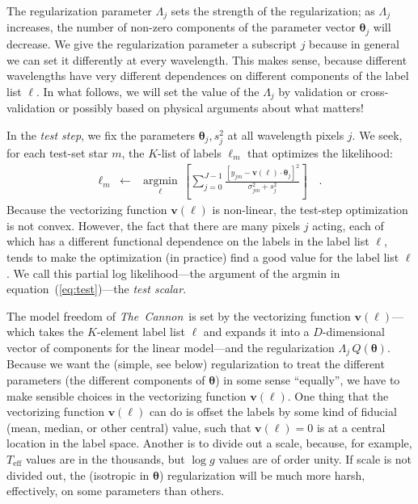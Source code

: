 \documentclass[12pt,preprint]{aastex}
\newcommand{\project}[1]{\textsl{#1}}
\newcommand{\TheCannon}{\project{The~Cannon}}
\newcommand{\logg}{\log g}
\newcommand{\Teff}{T_{\mathrm{eff}}}
\newcommand{\Dvector}[1]{\boldsymbol{#1}}
\newcommand{\vectheta}{\Dvector{\theta}}
\newcommand{\vecv}{\Dvector{v}}
\newcommand{\argmin}[1]{\underset{#1}{\operatorname{argmin}}\,}
\begin{document}
The regularization parameter $\Lambda_j$ sets the strength of the
regularization; as $\Lambda_j$ increases, the number of non-zero
components of the parameter vector $\vectheta_j$ will decrease.
We give the regularization parameter a subscript $j$ because in
general we can set it differently at every wavelength.
This makes sense, because different wavelengths have very different
dependences on different components of the label list $\ell$.
In what follows, we will set the value of the $\Lambda_j$ by
validation or cross-validation or possibly based on physical arguments
about what matters!


In the \emph{test step}, we fix the parameters $\vectheta_j,s^2_j$ at all
wavelength pixels $j$.
We seek, for each test-set star $m$, the $K$-list of labels $\ell_m$
that optimizes the likelihood:
\begin{eqnarray}\label{eq:test}
  \ell_m &\leftarrow& \argmin{\ell}\left[
    \sum_{j=0}^{J-1} \frac{[y_{jm}-\vecv(\ell)\cdot\vectheta_j]^2}{\sigma^2_{jm}+s^2_j}
    \right]
  \quad .
\end{eqnarray}
Because the vectorizing function $\vecv(\ell)$ is non-linear, the
test-step optimization is not convex.
However, the fact that there are many pixels $j$ acting, each of which
has a different functional dependence on the labels in the label list
$\ell$, tends to make the optimization (in practice) find a good value
for the label list $\ell$.
We call this partial log likelihood---the argument of the
argmin in equation~(\ref{eq:test})---the \emph{test scalar}.

The model freedom of \TheCannon\ is set by the vectorizing function
$\vecv(\ell)$---which takes the $K$-element label list $\ell$ and expands
it into a $D$-dimensional vector of components for the linear
model---and the regularization $\Lambda_j\,Q(\vectheta)$.
Because we want the (simple, see below) regularization to treat the
different parameters (the different components of $\vectheta$) in some
sense ``equally'', we have to make sensible choices in the vectorizing
function $\vecv(\ell)$.
One thing that the vectorizing function $\vecv(\ell)$ can do is offset the
labels by some kind of fiducial (mean, median, or other central)
value, such that $\vecv(\ell)=0$ is at a central location in the label
space.
Another is to divide out a scale, because, for example, $\Teff$ values
are in the thousands, but $\logg$ values are of order unity.
If scale is not divided out, the (isotropic in $\vectheta$)
regularization will be much more harsh, effectively, on some
parameters than others.
\end{document}
